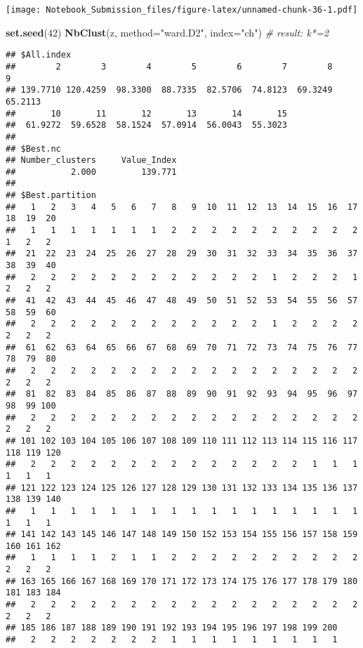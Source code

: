 \documentclass[
]{article}
\newenvironment{Shaded}{\begin{snugshade}}{\end{snugshade}}
\newcommand{\CommentTok}[1]{\textcolor[rgb]{0.56,0.35,0.01}{\textit{#1}}}
\newcommand{\DataTypeTok}[1]{\textcolor[rgb]{0.13,0.29,0.53}{#1}}
\newcommand{\DecValTok}[1]{\textcolor[rgb]{0.00,0.00,0.81}{#1}}
\newcommand{\KeywordTok}[1]{\textcolor[rgb]{0.13,0.29,0.53}{\textbf{#1}}}
\newcommand{\NormalTok}[1]{#1}
\newcommand{\StringTok}[1]{\textcolor[rgb]{0.31,0.60,0.02}{#1}}
\begin{document}
\texttt{[image: Notebook\_Submission\_files/figure-latex/unnamed-chunk-36-1.pdf]}

\begin{Shaded}
\begin{Highlighting}[]
\KeywordTok{set.seed}\NormalTok{(}\DecValTok{42}\NormalTok{)}
\KeywordTok{NbClust}\NormalTok{(z, }\DataTypeTok{method=}\StringTok{"ward.D2"}\NormalTok{, }\DataTypeTok{index=}\StringTok{"ch"}\NormalTok{) }\CommentTok{# result: k*=2}
\end{Highlighting}
\end{Shaded}

\begin{verbatim}
## $All.index
##        2        3        4        5        6        7        8        9 
## 139.7710 120.4259  98.3300  88.7335  82.5706  74.8123  69.3249  65.2113 
##       10       11       12       13       14       15 
##  61.9272  59.6528  58.1524  57.0914  56.0043  55.3023 
## 
## $Best.nc
## Number_clusters     Value_Index 
##           2.000         139.771 
## 
## $Best.partition
##   1   2   3   4   5   6   7   8   9  10  11  12  13  14  15  16  17  18  19  20 
##   1   1   1   1   1   1   1   2   2   2   2   2   2   2   2   2   2   1   2   2 
##  21  22  23  24  25  26  27  28  29  30  31  32  33  34  35  36  37  38  39  40 
##   2   2   2   2   2   2   2   2   2   2   2   2   1   2   2   2   1   2   2   2 
##  41  42  43  44  45  46  47  48  49  50  51  52  53  54  55  56  57  58  59  60 
##   2   2   2   2   2   2   2   2   2   2   2   2   1   2   2   2   2   2   2   2 
##  61  62  63  64  65  66  67  68  69  70  71  72  73  74  75  76  77  78  79  80 
##   2   2   2   2   2   2   2   2   2   2   2   2   2   2   2   2   2   2   2   2 
##  81  82  83  84  85  86  87  88  89  90  91  92  93  94  95  96  97  98  99 100 
##   2   2   2   2   2   2   2   2   2   2   2   2   2   2   2   2   2   2   2   2 
## 101 102 103 104 105 106 107 108 109 110 111 112 113 114 115 116 117 118 119 120 
##   2   2   2   2   2   2   2   2   2   2   2   2   2   2   1   1   1   1   1   1 
## 121 122 123 124 125 126 127 128 129 130 131 132 133 134 135 136 137 138 139 140 
##   1   1   1   1   1   1   1   1   1   1   1   1   1   1   1   1   1   1   1   1 
## 141 142 143 145 146 147 148 149 150 152 153 154 155 156 157 158 159 160 161 162 
##   1   1   1   1   2   1   1   2   2   2   2   2   2   2   2   2   2   2   2   2 
## 163 165 166 167 168 169 170 171 172 173 174 175 176 177 178 179 180 181 183 184 
##   2   2   2   2   2   2   2   2   2   2   2   2   2   2   2   2   2   2   2   2 
## 185 186 187 188 189 190 191 192 193 194 195 196 197 198 199 200 
##   2   2   2   2   2   2   2   1   1   1   1   1   1   1   1   1
\end{verbatim}
\end{document}
